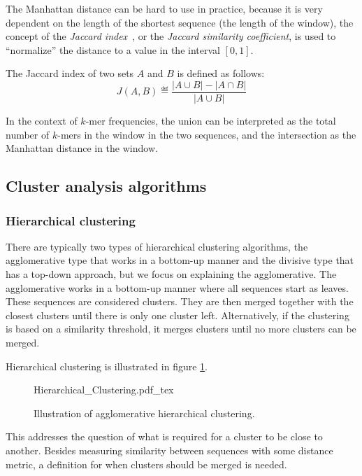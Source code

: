 The Manhattan distance can be hard to use in practice, because it is very
dependent on the length of the shortest sequence (the length of the window),
the concept of the \emph{Jaccard index}~\cite{jaccard1901,jaccard1912}, or the
\emph{Jaccard similarity coefficient}, is used to ``normalize'' the distance to
a value in the interval $[0,1]$.

The Jaccard index of two sets $A$ and $B$ is defined as follows:
\begin{equation}
  J(A, B) \eqdef \frac{|A \cup B| - |A \cap B|}{|A \cup B|}
\end{equation}

In the context of $k$-mer frequencies, the union can be interpreted as the
total number of $k$-mers in the window in the two sequences, and the
intersection as the Manhattan distance in the window.


\subsection{Cluster analysis algorithms}

\subsubsection{Hierarchical clustering}

There are typically two types of hierarchical clustering algorithms, the
agglomerative type that works in a bottom-up manner and the divisive type that
has a top-down approach, but we focus on explaining the agglomerative. The
agglomerative works in a bottom-up manner where all sequences start as leaves.
These sequences are considered clusters. They are then merged together with the
closest clusters until there is only one cluster left. Alternatively, if the
clustering is based on a similarity threshold, it merges clusters until no more
clusters can be merged.

Hierarchical clustering is illustrated in figure
\ref{fig:hierarchical_clustering}.

\begin{figure}[h!]
  \centering
  \def\svgwidth{\columnwidth}
  {Hierarchical_Clustering.pdf_tex}
  \caption{Illustration of agglomerative hierarchical clustering.}
  \label{fig:hierarchical_clustering}
\end{figure}

This addresses the question of what is required for a cluster to be close to
another. Besides measuring similarity between sequences with some distance
metric, a definition for when clusters should be merged is needed.

